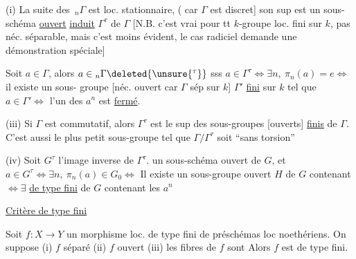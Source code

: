 (i) La suite des $\,{}_n\Gamma$ est loc. stationnaire,  (
car $\Gamma$ est discret]  son
sup est un sous-schéma \uline{ouvert} \uline{induit} $\Gamma^\tau$
de $\Gamma$ [N.B. c'est vrai pour tt $k$-groupe
loc. fini sur $k$, pas néc. séparable, mais
c'est moins évident, le cas radiciel
demande une démonstration spéciale]

 Soit $a\in\Gamma$, alors $a\in{}_n\Gamma\deleted{\unsure{^\tau}}$ sss 
$a\in\Gamma^\tau\Longleftrightarrow\exists n,\ \pi_n(a)=e\Longleftrightarrow$ il existe un sous-
 groupe  [néc. ouvert car $\Gamma$ sép sur $k$]
$\Gamma'$ \uline{fini} sur $k$ tel que $a\in\Gamma'\Longleftrightarrow$
l'un des $a^n$ est \uline{fermé}.

(iii) Si $\Gamma$ est commutatif, alors $\Gamma^\tau$ est le
sup des sous-groupes [ouverts] \uline{finis}
de $\Gamma$. C'est aussi le plus petit sous-groupe
tel que $\Gamma/\Gamma^\tau$ soit ``sans torsion''

(iv) Soit $G^\tau$ l'image inverse de $\Gamma^\tau$. 
un sous-schéma ouvert de $G$, et
$a\in G^\tau\Longleftrightarrow\exists n,\ \pi_n(a)\in G_0\Longleftrightarrow$ Il existe
un sous-groupe ouvert $H$ de $G$ contenant  
$\Longleftrightarrow\exists$  \uline{de type fini} de $G$ contenant les $a^n$

\uline{Critère de type fini}

 \quad Soit $f:X\longrightarrow Y$ un morphisme loc. de
type fini de préschémas loc noethériens. On
suppose (i) $f$ séparé (ii) $f$  ouvert (iii) les
fibres de $f$ sont  Alors $f$
est de type fini.

